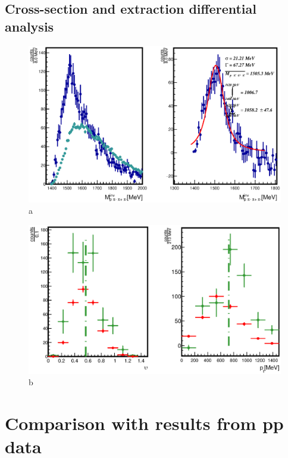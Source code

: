 \subsection{Cross-section and extraction differential analysis}
\begin{figure}[ht]
  \centering
  \includegraphics[width=0.9 \linewidth]{Chapter_analysisPNb/L1520.eps}
  \caption{a}
  \label{fig:L1520_pNb}
\end{figure}

\begin{figure}[ht]
  \centering
  \includegraphics[width=0.9 \linewidth]{Chapter_analysisPNb/YPt.eps}
  \caption{b}
  \label{fig:YPt_pNb}
\end{figure}

\section{Comparison with results from pp data}